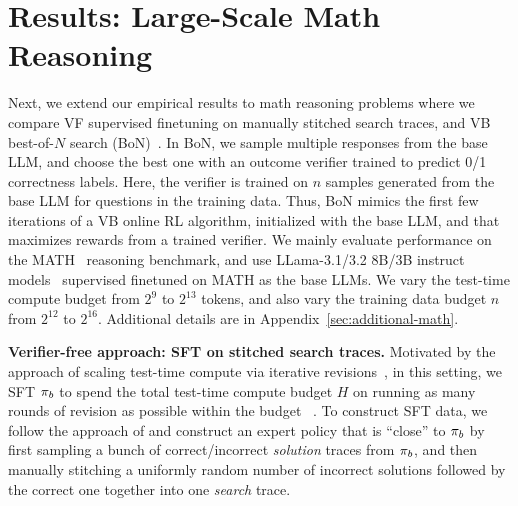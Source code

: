 \vspace{-0.20cm}
\section{Results: Large-Scale Math Reasoning}
\label{sec:experiments-math-reasoning}
\vspace{-0.1cm}

Next, we extend our empirical results to math reasoning problems where we compare VF supervised finetuning on manually stitched search traces,
and VB best-of-$N$ search (BoN)~\cite{cobbe2021training}. In BoN, we sample multiple responses from the base LLM, and choose the best one with an outcome verifier trained to predict 0/1 correctness labels. Here, the verifier is trained on 
$n$ samples generated from the base LLM for questions in the training data. Thus, BoN mimics the first few iterations of a VB online RL algorithm, initialized with the base LLM, and that maximizes rewards from a trained verifier.
We mainly evaluate performance on the MATH~\cite{hendrycksmath2021} reasoning benchmark, and use LLama-3.1/3.2 8B/3B instruct models~\cite{dubey2024llama} supervised finetuned on MATH as the base LLMs. We vary the test-time compute budget from $2^9$ to $2^{13}$ tokens, and also vary the training data budget $n$ from $2^{12}$ to $2^{16}$. Additional details are in Appendix~\ref{sec:additional-math}.

\textbf{Verifier-free approach: SFT on stitched search traces.} Motivated by the approach of scaling test-time compute via iterative revisions~\citep{qu2024recursive,snell2024scaling}, in this setting, we SFT $\pi_b$ to spend the total test-time compute budget $H$ on running as many rounds of revision as possible within the budget~\cite{kumar2024training} . To construct SFT data, we follow the approach of \citet{snell2024scaling} and construct an expert policy that is ``close'' to $\pi_b$ by first sampling a bunch of correct/incorrect \emph{solution} traces from $\pi_b$, and then manually stitching a uniformly random number of incorrect solutions followed by the correct one together into one \emph{search} trace. 


